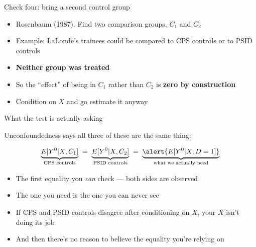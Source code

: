 \documentclass{beamer}
\newcommand{\highlight}[1]{\textcolor{accent}{\textbf{#1}}}
\begin{document}
\begin{frame}{Check four: bring a second control group}

\begin{itemize}
\item Rosenbaum (1987). Find two comparison groups, $C_1$ and $C_2$
\item Example: LaLonde's trainees could be compared to CPS controls or to PSID controls
\item \textbf{Neither group was treated}
\item So the ``effect'' of being in $C_1$ rather than $C_2$ is \highlight{zero by construction}
\item Condition on $X$ and go estimate it anyway
\end{itemize}

\end{frame}


\begin{frame}{What the test is actually asking}

Unconfoundedness says all three of these are the same thing:

$$\underbrace{E[Y^0|X, C_1]}_{\text{CPS controls}} \;=\; \underbrace{E[Y^0|X, C_2]}_{\text{PSID controls}} \;=\; \underbrace{\alert{E[Y^0|X, D=1]}}_{\text{what we actually need}}$$

\vspace{0.5em}

\begin{itemize}
\item The first equality you \emph{can} check --- both sides are observed
\item The one you need is the one you can never see
\item If CPS and PSID controls disagree after conditioning on $X$, your $X$ isn't doing its job
\item And then there's no reason to believe the equality you're relying on
\end{itemize}

\end{frame}
\end{document}
